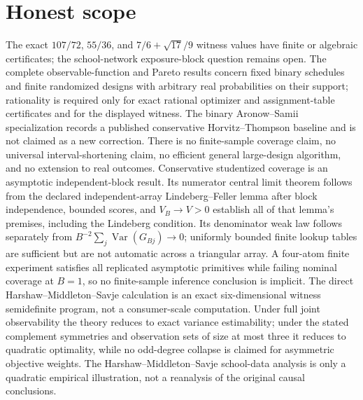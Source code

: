 \documentclass{article}
\begin{document}
\section{Honest scope}

The exact \(107/72\), \(55/36\), and \(7/6+\sqrt{17}/9\) witness values have finite or algebraic certificates; the school-network exposure-block question remains open. The complete observable-function and Pareto results concern fixed binary schedules and finite randomized designs with arbitrary real probabilities on their support; rationality is required only for exact rational optimizer and assignment-table certificates and for the displayed witness. The binary Aronow--Samii specialization records a published conservative Horvitz--Thompson baseline and is not claimed as a new correction. There is no finite-sample coverage claim, no universal interval-shortening claim, no efficient general large-design algorithm, and no extension to real outcomes. Conservative studentized coverage is an asymptotic independent-block result. Its numerator central limit theorem follows from the declared independent-array Lindeberg--Feller lemma after block independence, bounded scores, and \(V_B\to V>0\) establish all of that lemma's premises, including the Lindeberg condition. Its denominator weak law follows separately from \(B^{-2}\sum_j\operatorname{Var}(G_{Bj})\to0\); uniformly bounded finite lookup tables are sufficient but are not automatic across a triangular array. A four-atom finite experiment satisfies all replicated asymptotic primitives while failing nominal coverage at \(B=1\), so no finite-sample inference conclusion is implicit. The direct Harshaw--Middleton--Savje calculation is an exact six-dimensional witness semidefinite program, not a consumer-scale computation. Under full joint observability the theory reduces to exact variance estimability; under the stated complement symmetries and observation sets of size at most three it reduces to quadratic optimality, while no odd-degree collapse is claimed for asymmetric objective weights. The Harshaw--Middleton--Savje school-data analysis is only a quadratic empirical illustration, not a reanalysis of the original causal conclusions.
\end{document}
